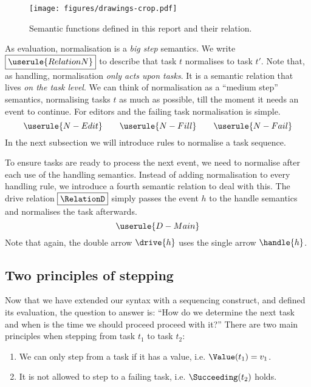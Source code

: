 \begin{figure}
  \centering
  \texttt{[image: figures/drawings-crop.pdf]}
  \caption{Semantic functions defined in this report and their relation.}
  \label{fig:semantic-functions}
\end{figure}

As evaluation,
normalisation is a \emph{big step} semantics.
We write $\boxed{\userule{RelationN}}$ to describe that
task $t$ normalises to task $t'$.
Note that, as handling,
normalisation \emph{only acts upon tasks}.
It is a semantic relation that lives \emph{on the task level}.
We can think of normalisation as a \enquote{medium step} semantics,
normalising tasks $t$ as much as possible,
till the moment it needs an event to continue.
For editors and the failing task normalisation is simple.
\begin{equation*}
  \userule{N-Edit} \qquad \userule{N-Fill} \qquad \userule{N-Fail}
\end{equation*}
In the next subsection we will introduce rules to normalise a task sequence.

To ensure tasks are ready to process the next event,
we need to normalise after each use of the handling semantics.
Instead of adding normalisation to every handling rule,
we introduce a fourth semantic relation to deal with this.
The drive relation $\boxed{\RelationD}$ simply passes the event $h$ to the handle semantics
and normalises the task afterwards.
\begin{equation*}
  \userule{D-Main}
\end{equation*}
Note that again,
the double arrow $\drive{h}$ uses the single arrow $\handle{h}$.



\subsection{Two principles of stepping}
\label{sec:normalise-sequence}

Now that we have extended our syntax with a sequencing construct,
and defined its evaluation,
the question to answer is:
\enquote{How do we determine the next task
and when is the time we should proceed proceed with it?}
There are two main principles when stepping from task $t_1$ to task $t_2$:
\begin{enumerate}[S1]
  \item We can only step from a task if it has a value, i.e. $\Value(t_1) = v_1$. \label{itm:step1}
  \item It is not allowed to step to a failing task, i.e. $\Succeeding(t_2)$ holds. \label{itm:step2}
\end{enumerate}


